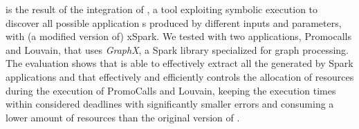 \tool is the result of the integration of \dSymb, a tool exploiting symbolic execution to discover all possible application {\plan}s produced by different inputs and parameters, with (a modified version of) xSpark.
We tested \tool with two applications, Promocalls and Louvain, that uses \textit{GraphX}, a Spark library specialized for graph processing.
The evaluation shows that \approach is able to effectively extract all the \plans generated by Spark applications and that \tool effectively and efficiently controls the allocation of resources during the execution of PromoCalls and Louvain, keeping the execution times within considered deadlines with significantly smaller errors and consuming a lower amount of resources than the original version of \cSpark.

